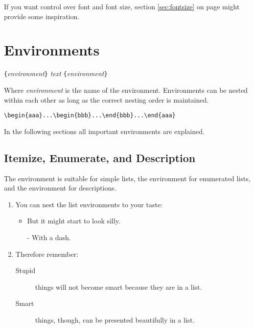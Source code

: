 If you want control over font and font size, section \ref{sec:fontsize} on
page \pageref{sec:fontsize} might provide some inspiration.

\section{Environments} \label{env}

\begin{lscommand}
\verb|{|\emph{environment}\verb|}|\quad
   \emph{text}\quad
{}\verb|{|\emph{environment}\verb|}|
\end{lscommand}
\noindent Where \emph{environment} is the name of the environment. Environments can be
nested within each other as long as the correct nesting order is
maintained.
\begin{code}
\verb|\begin{aaa}...\begin{bbb}...\end{bbb}...\end{aaa}|
\end{code}

\noindent In the following sections all important environments are explained.

\subsection{Itemize, Enumerate, and Description}

The  environment is suitable for simple lists, the
 environment for enumerated lists, and the
 environment for descriptions.

\begin{example}
\begin{enumerate}
\item You can nest the list
environments to your taste:
\begin{itemize}
\item But it might start to
look silly.
\item[-] With a dash.
\end{itemize}
\item Therefore remember:
\begin{description}
\item[Stupid] things will not
become smart because they are
in a list.
\item[Smart] things, though,
can be presented beautifully
in a list.
\end{description}
\end{enumerate}
\end{example}

